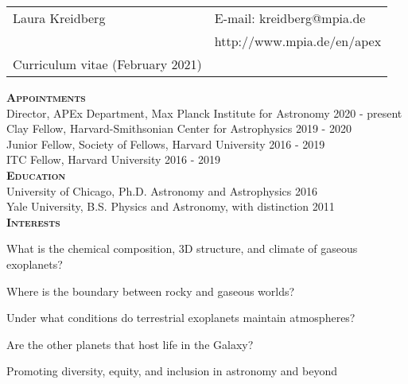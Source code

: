\documentclass[12pt,letterpaper]{article}
\def\name{Laura R. Kreidberg}
\begin{document}
\sloppy


\begin{tabular}{@{}p{4.0in}@{}p{5.0in}}
    \LARGE{Laura Kreidberg}                  & E-mail: kreidberg@mpia.de\\  
    \,                                       & http://www.mpia.de/en/apex \\ 
    \large{Curriculum vitae} (February 2021) & \, \\
\end{tabular}
\vspace{8mm}

\textbf{\textsc{Appointments}}\\
Director, APEx Department, Max Planck Institute for Astronomy \hfill 2020 - present\\
Clay Fellow, Harvard-Smithsonian Center for Astrophysics \hfill 2019 - 2020\\
Junior Fellow, Society of Fellows, Harvard University \hfill 2016 - 2019\\
ITC Fellow, Harvard University \hfill 2016 - 2019\\

\textbf{\textsc{Education}}\\
University of Chicago, Ph.D. Astronomy and Astrophysics \hfill 2016\\
Yale University, B.S. Physics and Astronomy, with distinction \hfill 2011\\

\textbf{\textsc{Interests}}
\begin{compactitem}
\item What is the chemical composition, 3D structure, and climate of gaseous exoplanets?  
\item Where is the boundary between rocky and gaseous worlds? 
\item Under what conditions do terrestrial exoplanets maintain atmospheres?
\item Are the other planets that host life in the Galaxy? 
\item Promoting diversity, equity, and inclusion in astronomy and beyond
\end{compactitem}
\vspace{6mm}
\end{document}
